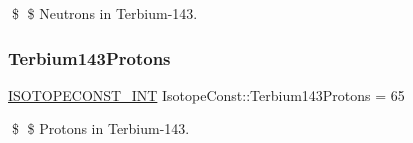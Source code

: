 \$ \$ Neutrons in Terbium-\/143. \mbox{\label{group___isotope_const-_terbium-_tb143_ga805dfd6540415f387d7bd98639777bd0}} 
\subsubsection{\texorpdfstring{Terbium143\+Protons}{Terbium143Protons}}
{\footnotesize\ttfamily \mbox{\hyperlink{group___isotope_const-_macros_ga5f18360b3e99483a35c32d789e62621c}{I\+S\+O\+T\+O\+P\+E\+C\+O\+N\+S\+T\+\_\+\+I\+NT}} Isotope\+Const\+::\+Terbium143\+Protons = 65}

\$ \$ Protons in Terbium-\/143. 